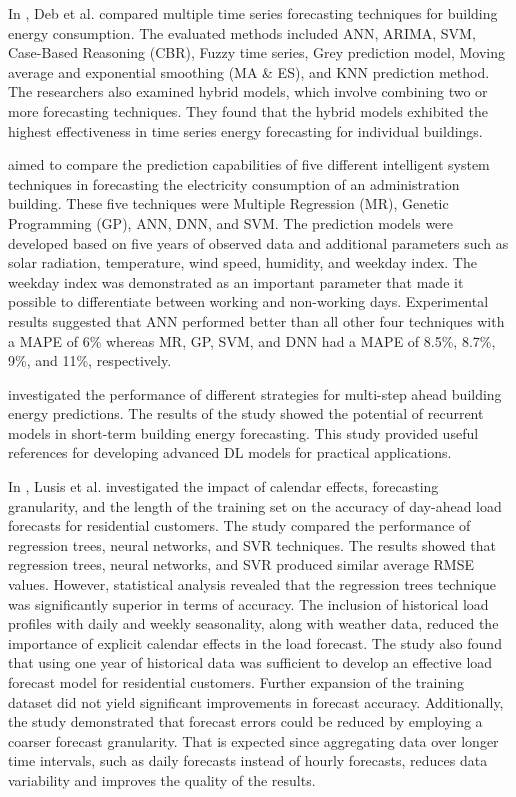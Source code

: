 In \cite{DEB2017902}, Deb et al. compared multiple time series forecasting techniques for building energy consumption.
The evaluated methods included ANN, ARIMA, SVM, Case-Based Reasoning (CBR), Fuzzy time series, Grey prediction model, Moving average and exponential smoothing (MA \& ES), and KNN prediction method.
The researchers also examined hybrid models, which involve combining two or more forecasting techniques.
They found that the hybrid models exhibited the highest effectiveness in time series energy forecasting for individual buildings.

\cite{AMBER2018886} aimed to compare the prediction capabilities of five different intelligent system techniques in forecasting the electricity consumption of an administration building.
These five techniques were Multiple Regression (MR), Genetic Programming (GP), ANN, DNN, and SVM.
The prediction models were developed based on five years of observed data and additional parameters such as solar radiation, temperature, wind speed, humidity, and weekday index.
The weekday index was demonstrated as an important parameter that made it possible to differentiate between working and non-working days.
Experimental results suggested that ANN performed better than all other four techniques with a MAPE of 6\% whereas MR, GP, SVM, and DNN had a MAPE of 8.5\%, 8.7\%, 9\%, and 11\%, respectively.

\cite{FAN2019700} investigated the performance of different strategies for multi-step ahead building energy predictions.
The results of the study showed the potential of recurrent models in short-term building energy forecasting.
This study provided useful references for developing advanced DL models for practical applications.

In \cite{LUSIS2017654}, Lusis et al. investigated the impact of calendar effects, forecasting granularity, and the length of the training set on the accuracy of day-ahead load forecasts for residential customers.
The study compared the performance of regression trees, neural networks, and SVR techniques.
The results showed that regression trees, neural networks, and SVR produced similar average RMSE values.
However, statistical analysis revealed that the regression trees technique was significantly superior in terms of accuracy.
The inclusion of historical load profiles with daily and weekly seasonality, along with weather data, reduced the importance of explicit calendar effects in the load forecast.
The study also found that using one year of historical data was sufficient to develop an effective load forecast model for residential customers.
Further expansion of the training dataset did not yield significant improvements in forecast accuracy.
Additionally, the study demonstrated that forecast errors could be reduced by employing a coarser forecast granularity.
That is expected since aggregating data over longer time intervals, such as daily forecasts instead of hourly forecasts, reduces data variability and improves the quality of the results.

